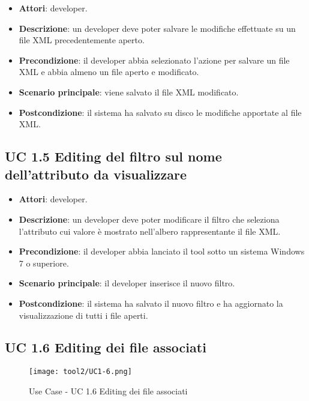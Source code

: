 		\begin{itemize}
			\item\textbf{Attori}: developer.
			\item\textbf{Descrizione}: un developer deve poter salvare le modifiche effettuate su un file XML precedentemente aperto.
			\item\textbf{Precondizione}: il developer abbia selezionato l'azione per salvare un file XML e abbia almeno un file aperto e modificato.
			\item\textbf{Scenario principale}: viene salvato il file XML modificato.
			\item\textbf{Postcondizione}: il sistema ha salvato su disco le modifiche apportate al file XML.
		\end{itemize}
		
	\subsection{UC 1.5 Editing del filtro sul nome dell'attributo da visualizzare}
		\label{subsec:XEUC1.5}
		
		\begin{itemize}
			\item\textbf{Attori}: developer.
			\item\textbf{Descrizione}: un developer deve poter modificare il filtro che seleziona l'attributo cui valore è mostrato nell'albero rappresentante il file XML.
			\item\textbf{Precondizione}: il developer abbia lanciato il tool sotto un sistema Windows 7 o superiore.
			\item\textbf{Scenario principale}: il developer inserisce il nuovo filtro.
			\item\textbf{Postcondizione}: il sistema ha salvato il nuovo filtro e ha aggiornato la visualizzazione di tutti i file aperti.
		\end{itemize}
		
	\subsection{UC 1.6 Editing dei file associati}
		\label{subsec:XEUC1.6}
		
		\begin{figure}[!h] 
			\centering 
			\texttt{[image: tool2/UC1-6.png]} 
			\caption{Use Case - UC 1.6 Editing dei file associati}
		\end{figure}
		
